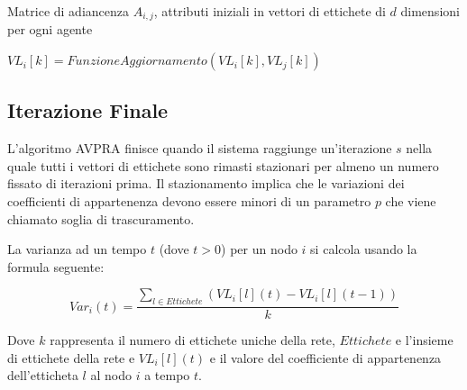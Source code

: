 \documentclass[a4paper,12pt]{report}
\begin{document}
		\begin{algorithmic}
			\REQUIRE Matrice di adiancenza $A_{i, j}$, attributi iniziali in vettori di ettichete di $d$ dimensioni per ogni agente


				\STATE {}

					
					\STATE {}


						\STATE {}

							\STATE $VL_i[k] = FunzioneAggiornamento(VL_i[k], VL_j[k])$

						\ENDIF
					\ENDFOR
				\ENDFOR	
			\ENDFOR
		\end{algorithmic}

		\subsection{Iterazione Finale}
		L'algoritmo AVPRA finisce quando il sistema raggiunge un'iterazione $s$ nella quale tutti i vettori di ettichete sono rimasti stazionari per almeno un numero fissato di iterazioni prima. Il stazionamento implica che le variazioni dei coefficienti di appartenenza devono essere minori di un parametro $p$ che viene chiamato soglia di trascuramento.  \cite{avpra}

		La varianza ad un tempo $t$ (dove $t > 0$) per un nodo $i$ si calcola usando la formula seguente:
		
		\begin{equation}
			Var_i(t) = \frac{\sum_{l \in Ettichete} (VL_i[l](t) - VL_i[l](t-1))}{k}
		\end{equation}

		Dove $k$ rappresenta il numero di ettichete uniche della rete, $Ettichete$ e l'insieme di ettichete della rete e $VL_i[l](t)$ e il valore del coefficiente di appartenenza dell'etticheta $l$ al nodo $i$ a tempo $t$.
\end{document}
